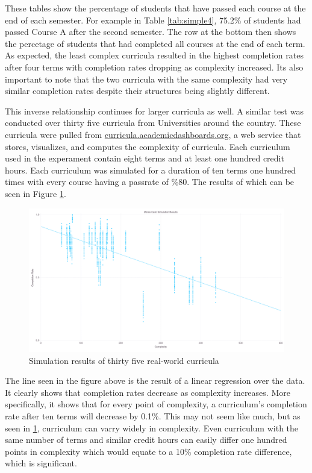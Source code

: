 \documentclass[botnum, fleqn]{unmeethesis}
\begin{document}
These tables show the percentage of students that have passed each course at the end of each semester. For example in Table \ref{tab:simple4}, 75.2\% of students had passed Course A after the second semester. The row at the bottom then shows the percetage of students that had completed all courses at the end of each term. As expected, the least complex curricula resulted in the highest completion rates after four terms with completion rates dropping as complexity increased. Its also important to note that the two curricula with the same complexity had very similar completion rates despite their structures being slightly different.

This inverse relationship continues for larger curricula as well. A similar test was conducted over thirty five curricula from Universities around the country. These curricula were pulled from \href{http://curricula.academicdashboards.org}{curricula.academicdashboards.org}, a web service that stores, visualizes, and computes the complexity of curricula. Each curriculum used in the experament contain eight terms and at least one hundred credit hours. Each curriculum was simulated for a duration of ten terms one hundred times with every course having a passrate of \%80. The results of which can be seen in Figure \ref{fig:monte_web}.

\begin{figure}[h!]
\centerline{\includegraphics[scale=0.2]{./figures/monteCarloEight.png}}
\caption{Simulation results of thirty five real-world curricula} 
\label{fig:monte_web}
\end{figure}

The line seen in the figure above is the result of a linear regression over the data. It clearly shows that completion rates decrease as complexity increases. More specifically, it shows that for every point of complexity, a curriculum's completion rate after ten terms will decrease by 0.1\%. This may not seem like much, but as seen in \ref{fig:monte_web}, curriculum can varry widely in complexity. Even curriculum with the same number of terms and similar credit hours can easily differ one hundred points in complexity which would equate to a 10\% completion rate difference, which is significant.
\end{document}
